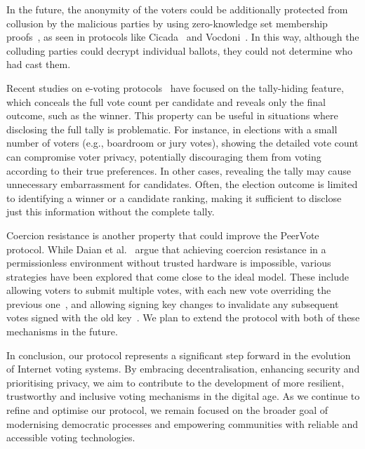 \documentclass[runningheads]{llncs}
\begin{document}
In the future, the anonymity of the voters could be additionally protected from collusion by the malicious parties by using zero-knowledge set membership proofs~\cite{Semaphorea}, as seen in protocols like Cicada~\cite{BuildingCicadaPrivate} and Vocdoni~\cite{VocdoniIntroductionVocdoni}. In this way, although the colluding parties could decrypt individual ballots, they could not determine who had cast them. 

Recent studies on e-voting protocols~\cite{kustersOrdinosVerifiableTallyHiding2020} have focused on the tally-hiding feature, which conceals the full vote count per candidate and reveals only the final outcome, such as the winner. This property can be useful in situations where disclosing the full tally is problematic. For instance, in elections with a small number of voters (e.g., boardroom or jury votes), showing the detailed vote count can compromise voter privacy, potentially discouraging them from voting according to their true preferences. In other cases, revealing the tally may cause unnecessary embarrassment for candidates. Often, the election outcome is limited to identifying a winner or a candidate ranking, making it sufficient to disclose just this information without the complete tally.

Coercion resistance is another property that could improve the PeerVote protocol. While Daian et al.~\cite{daianOnChainVoteBuying2018} argue that achieving coercion resistance in a permissionless environment without trusted hardware is impossible, various strategies have been explored that come close to the ideal model. These include allowing voters to submit multiple votes, with each new vote overriding the previous one~\cite{VocdoniIntroductionVocdoni}, and allowing signing key changes to invalidate any subsequent votes signed with the old key~\cite{ethereumfoundationMinimalAntiCollusionInfrastructure2022, PrivacyscalingexplorationsMaci2023}. We plan to extend the protocol with both of these mechanisms in the future.

In conclusion, our protocol represents a significant step forward in the evolution of Internet voting systems. By embracing decentralisation, enhancing security and prioritising privacy, we aim to contribute to the development of more resilient, trustworthy and inclusive voting mechanisms in the digital age. As we continue to refine and optimise our protocol, we remain focused on the broader goal of modernising democratic processes and empowering communities with reliable and accessible voting technologies.




\end{document}
